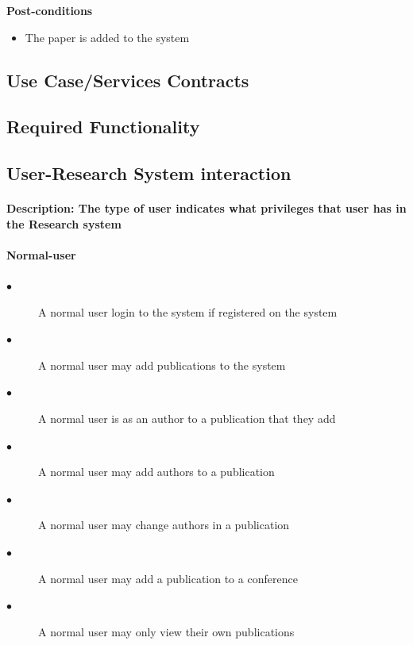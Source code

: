 \documentclass[a4paper]{article}
\begin{document}
    \textbf{Post-conditions}
    \begin{itemize}
        \item The paper is added to the system
    \end{itemize}
    
	\subsection{Use Case/Services Contracts}
	
	\subsection{Required Functionality}
	\subsection{User-Research System interaction}
	\paragraph{\textbf{Description:} The type of user indicates what privileges that user has in the Research system}
	\paragraph{\textbf{Normal-user}}
	\begin{description}
		\item[$\bullet$] A normal user login to the system if registered on the system
		\item[$\bullet$] A normal user may add publications to the system
		\item[$\bullet$] A normal user is as an author to a publication that they add
		\item[$\bullet$] A normal user may add authors to a publication
		\item[$\bullet$] A normal user may change authors in a publication
		\item[$\bullet$] A normal user may add a publication to a conference
		\item[$\bullet$] A normal user may only view their own publications
	\end{description}
\end{document}
